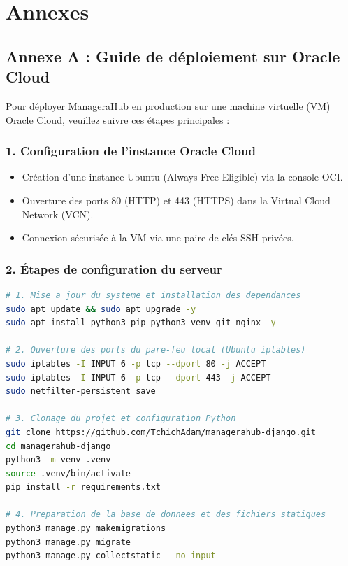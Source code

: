 \chapter*{Annexes}

\section*{Annexe A : Guide de déploiement sur Oracle Cloud}

Pour déployer ManageraHub en production sur une machine virtuelle (VM) Oracle Cloud, veuillez suivre ces étapes principales :

\subsection*{1. Configuration de l'instance Oracle Cloud}
\begin{itemize}
    \item Création d'une instance Ubuntu (Always Free Eligible) via la console OCI.
    \item Ouverture des ports 80 (HTTP) et 443 (HTTPS) dans la Virtual Cloud Network (VCN).
    \item Connexion sécurisée à la VM via une paire de clés SSH privées.
\end{itemize}

\subsection*{2. Étapes de configuration du serveur}
\begin{lstlisting}[language=bash, caption=Installation des paquets et configuration système]
# 1. Mise a jour du systeme et installation des dependances
sudo apt update && sudo apt upgrade -y
sudo apt install python3-pip python3-venv git nginx -y

# 2. Ouverture des ports du pare-feu local (Ubuntu iptables)
sudo iptables -I INPUT 6 -p tcp --dport 80 -j ACCEPT
sudo iptables -I INPUT 6 -p tcp --dport 443 -j ACCEPT
sudo netfilter-persistent save

# 3. Clonage du projet et configuration Python
git clone https://github.com/TchichAdam/managerahub-django.git
cd managerahub-django
python3 -m venv .venv
source .venv/bin/activate
pip install -r requirements.txt

# 4. Preparation de la base de donnees et des fichiers statiques
python3 manage.py makemigrations
python3 manage.py migrate
python3 manage.py collectstatic --no-input
\end{lstlisting}

